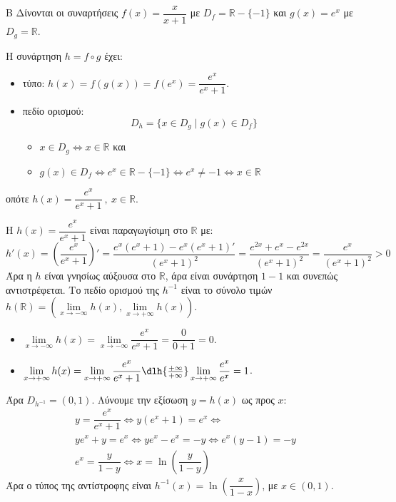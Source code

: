 \begin{thema}{Β}
Δίνονται οι συναρτήσεις $f(x) = \dfrac{x}{x+1}$ με $D_f = \mathbb{R} - \{-1\}$ και $g(x) = e^x$ με $D_g = \mathbb{R}$.

\begin{erwthma}
\item Η συνάρτηση $h = f \circ g$ έχει:
\begin{itemize}
\item τύπο: $h(x) = f(g(x)) = f(e^x) = \dfrac{e^x}{e^x + 1}$.
\item πεδίο ορισμού:\[ D_h = \{x \in D_g \mid g(x) \in D_f\}  \]
\begin{itemize}[label=\tiny\faPlay]
\item $x\in D_g\Leftrightarrow x\in\mathbb{R}$ και 
\item $g(x)\in D_f\Leftrightarrow e^x\in\mathbb{R}-\{-1\}\Leftrightarrow e^x\neq -1\Leftrightarrow x\in\mathbb{R}$
\end{itemize}
\end{itemize}
οπότε $h(x)=\dfrac{e^x}{e^x+1}\ ,\ x\in\mathbb{R}$.
\item Η $h(x) = \dfrac{e^x}{e^x+1}$ είναι παραγωγίσιμη στο $\mathbb{R}$ με:
\[ h'(x) = \left( \dfrac{e^x}{e^x+1} \right)' = \dfrac{e^x(e^x+1) - e^x(e^x+1)'}{(e^x+1)^2} = \dfrac{e^{2x} + e^x - e^{2x}}{(e^x+1)^2} = \dfrac{e^x}{(e^x+1)^2}>0 \]
Άρα η $h$ είναι γνησίως αύξουσα στο $\mathbb{R}$, άρα είναι συνάρτηση $1-1$ και συνεπώς αντιστρέφεται. Το πεδίο ορισμού της $h^{-1}$ είναι το σύνολο τιμών $h(\mathbb{R}) = \left( \lim\limits_{x\to-\infty} h(x), \lim\limits_{x\to+\infty} h(x) \right)$.
\begin{itemize}
\item $\lim\limits_{x\to-\infty} h(x) = \lim\limits_{x\to-\infty} \dfrac{e^x}{e^x+1} = \dfrac{0}{0+1} = 0$.
\item $\lim\limits_{x\to+\infty} h(x) = \lim\limits_{x\to+\infty} \dfrac{e^x}{e^x+1}\dlh{\frac{+\infty}{+\infty}} \lim\limits_{x\to+\infty} \dfrac{e^x}{e^{x}} = 1$.
\end{itemize}
Άρα $D_{h^{-1}} = (0, 1)$.
Λύνουμε την εξίσωση $y = h(x)$ ως προς $x$:
\begin{gather*}
y = \dfrac{e^x}{e^x+1} \Leftrightarrow y(e^x+1) = e^x \Leftrightarrow\\ ye^x + y = e^x \Leftrightarrow ye^x - e^x = -y \Leftrightarrow e^x(y-1) = -y \\
e^x = \dfrac{y}{1-y}\Leftrightarrow x = \ln\left(\dfrac{y}{1-y}\right)
\end{gather*}
Άρα ο τύπος της αντίστροφης είναι $h^{-1}(x) = \ln\left(\dfrac{x}{1-x}\right)$, με $x \in (0, 1)$.


\end{erwthma}
\end{thema}
